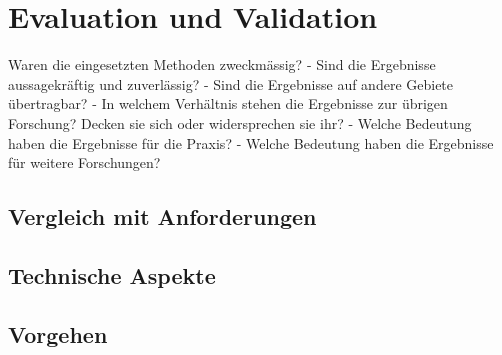 \chapter{Evaluation und Validation}
\label{ch:Eval}

Waren die eingesetzten Methoden zweckmässig?
- Sind die Ergebnisse aussagekräftig und zuverlässig?
- Sind die Ergebnisse auf andere Gebiete übertragbar?
- In welchem Verhältnis stehen die Ergebnisse zur übrigen Forschung? Decken sie sich oder
widersprechen sie ihr?
- Welche Bedeutung haben die Ergebnisse für die Praxis?
- Welche Bedeutung haben die Ergebnisse für weitere Forschungen?

\section{Vergleich mit Anforderungen}
\label{sec:VergleichAnforderungen}

\section{Technische Aspekte}

\section{Vorgehen}
